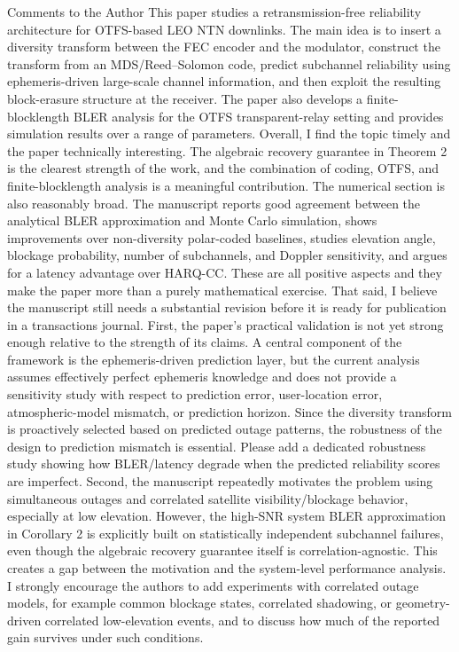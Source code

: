 Comments to the Author
This paper studies a retransmission-free reliability architecture for OTFS-based LEO NTN downlinks. The main idea is to insert a diversity transform between the FEC encoder and the modulator, construct the transform from an MDS/Reed–Solomon code, predict subchannel reliability using ephemeris-driven large-scale channel information, and then exploit the resulting block-erasure structure at the receiver. The paper also develops a finite-blocklength BLER analysis for the OTFS transparent-relay setting and provides simulation results over a range of parameters. Overall, I find the topic timely and the paper technically interesting. The algebraic recovery guarantee in Theorem 2 is the clearest strength of the work, and the combination of coding, OTFS, and finite-blocklength analysis is a meaningful contribution.
The numerical section is also reasonably broad. The manuscript reports good agreement between the analytical BLER approximation and Monte Carlo simulation, shows improvements over non-diversity polar-coded baselines, studies elevation angle, blockage probability, number of subchannels, and Doppler sensitivity, and argues for a latency advantage over HARQ-CC. These are all positive aspects and they make the paper more than a purely mathematical exercise.
That said, I believe the manuscript still needs a substantial revision before it is ready for publication in a transactions journal.
First, the paper’s practical validation is not yet strong enough relative to the strength of its claims. A central component of the framework is the ephemeris-driven prediction layer, but the current analysis assumes effectively perfect ephemeris knowledge and does not provide a sensitivity study with respect to prediction error, user-location error, atmospheric-model mismatch, or prediction horizon. Since the diversity transform is proactively selected based on predicted outage patterns, the robustness of the design to prediction mismatch is essential. Please add a dedicated robustness study showing how BLER/latency degrade when the predicted reliability scores are imperfect.
Second, the manuscript repeatedly motivates the problem using simultaneous outages and correlated satellite visibility/blockage behavior, especially at low elevation. However, the high-SNR system BLER approximation in Corollary 2 is explicitly built on statistically independent subchannel failures, even though the algebraic recovery guarantee itself is correlation-agnostic. This creates a gap between the motivation and the system-level performance analysis. I strongly encourage the authors to add experiments with correlated outage models, for example common blockage states, correlated shadowing, or geometry-driven correlated low-elevation events, and to discuss how much of the reported gain survives under such conditions.
